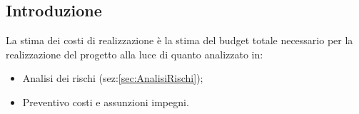 \subsection{Introduzione}
La stima dei costi di realizzazione è la stima del budget totale necessario per la realizzazione del progetto alla luce di quanto analizzato in: 
\begin{itemize}
    \item Analisi dei rischi (sez:\ref{sec:AnalisiRischi});
    \item Preventivo costi e assunzioni impegni.
\end{itemize}
